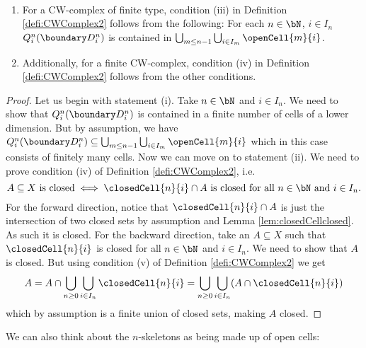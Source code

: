 \begin{rem}~
    \begin{enumerate}
        \item For a CW-complex of finite type, condition (iii) in Definition \ref{defi:CWComplex2} follows from the following:
        For each $n \in \bN$, $i \in I_n$ $Q_i^n(\boundary D_i^n)$ is contained in $\bigcup_{m \le n - 1}\bigcup_{i \in I_m}\openCell{m}{i}$. 
        \href{https://github.com/scholzhannah/CWComplexes/blob/7be4872a05b534011cc969eb5b80a4b7f0bf57e2/CWcomplexes/Finite.lean#L45-L72}{\faExternalLink}
        \item Additionally, for a finite CW-complex, condition (iv) in Definition \ref{defi:CWComplex2} follows from the other conditions.
        \href{https://github.com/scholzhannah/CWComplexes/blob/7be4872a05b534011cc969eb5b80a4b7f0bf57e2/CWcomplexes/Finite.lean#L74-L122}{\faExternalLink}
    \end{enumerate}
\end{rem}
\begin{proof}
    Let us begin with statement (i).
    Take $n \in \bN$ and $i \in I_n$.
    We need to show that $Q_i^n(\boundary D_i^n)$ is contained in a finite number of cells of a lower dimension.
    But by assumption, we have $Q_i^n(\boundary D_i^n) \subseteq \bigcup_{m \le n - 1}\bigcup_{i \in I_m}\openCell{m}{i}$ which in this case consists of finitely many cells.
    Now we can move on to statement (ii).
    We need to prove condition (iv) of Definition \ref{defi:CWComplex2}, i.e.
    \[A \subseteq X \text{ is closed} \iff \closedCell{n}{i} \cap A \text{ is closed for all } n \in \bN \text{ and } i \in I_n.\]
    For the forward direction, notice that $\closedCell{n}{i} \cap A$ is just the intersection of two closed sets by assumption and Lemma \ref{lem:closedCellclosed}.
    As such it is closed.
    For the backward direction, take an $A \subseteq X$ such that $\closedCell{n}{i}$ is closed for all $n \in \bN$ and $i \in I_n$.
    We need to show that $A$ is closed.
    But using condition (v) of Definition \ref{defi:CWComplex2} we get
    \[A = A \cap \bigcup_{n \ge 0}\bigcup_{i \in I_n} \closedCell{n}{i} = \bigcup_{n \ge 0}\bigcup_{i \in I_n} (A \cap \closedCell{n}{i})\]
    which by assumption is a finite union of closed sets, making $A$ closed.
\end{proof}

We can also think about the $n$-skeletons as being made up of open cells:

